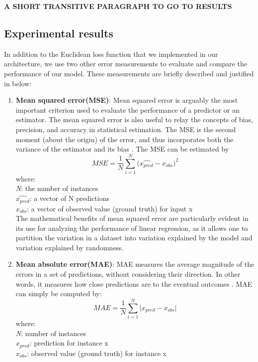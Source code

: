  

\textbf{A SHORT TRANSITIVE PARAGRAPH TO GO TO RESULTS}

\subsection{Experimental results}

In addition to the Euclidean loss function that we implemented in our architecture, we use two other error measurements to evaluate and compare the performance of our model. These measurements are briefly described and justified in below:
\begin{enumerate}
\item \textbf{Mean squared error(MSE)}: Mean squared error is arguably the most important criterion used to evaluate the performance of a predictor or an estimator. The mean squared error is also useful to relay the concepts of bias, precision, and accuracy in statistical estimation. The MSE is the second moment (about the origin) of the error, and thus incorporates both the variance of the estimator and its bias \cite{lehmann1998theory}. The MSE can be estimated by
$$MSE = {\frac{1} {N}{\sum\limits_{i = 1}^N {(\hat{x_{pred}} - x_{obs} } })^{2} } $$
where:\\
\textit{N}: the number of instances\\
\textit{ $\hat{x_{pred}}$}: a vector of N predictions\\
\textit{$x_{obs}$}: a vector of observed value (ground truth) for input x\\

The mathematical benefits of mean squared error are particularly evident in its use for analyzing the performance of linear regression, as it allows one to partition the variation in a dataset into variation explained by the model and variation explained by randomness.
\item \textbf{Mean absolute error(MAE)}: MAE measures the average magnitude of the errors in a set of predictions, without considering their direction. In other words, it measures how close predictions are to the eventual outcomes \cite{willmott2005advantages}. MAE can simply be computed by:
$$MAE = {\frac{1} {N}{\sum\limits_{i = 1}^N {|x_{pred} - x_{obs} } }| } $$
where:\\
\textit{N}: number of instances\\
\textit{ $x_{pred}$}: prediction for instance x\\
\textit{$x_{obs}$}: observed value (ground truth) for instance x
\end{enumerate}


